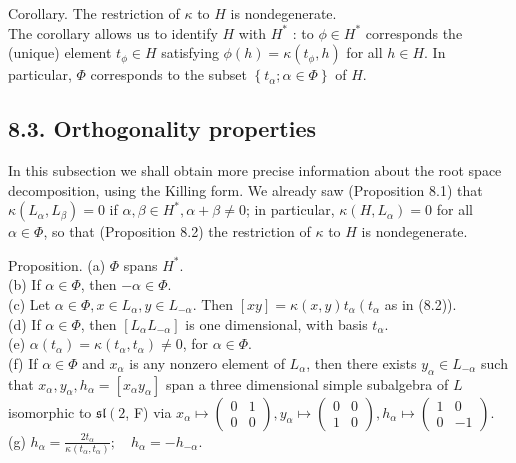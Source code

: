 \documentclass[10pt]{article}
\begin{document}
Corollary. The restriction of $\kappa$ to $H$ is nondegenerate.\\
The corollary allows us to identify $H$ with $H^{*}$ : to $\phi \in H^{*}$ corresponds the (unique) element $t_{\phi} \in H$ satisfying $\phi(h)=\kappa\left(t_{\phi}, h\right)$ for all $h \in H$. In particular, $\Phi$ corresponds to the subset $\left\{t_{\alpha} ; \alpha \in \Phi\right\}$ of $H$.

\subsection*{8.3. Orthogonality properties}
In this subsection we shall obtain more precise information about the root space decomposition, using the Killing form. We already saw (Proposition 8.1) that $\kappa\left(L_{\alpha}, L_{\beta}\right)=0$ if $\alpha, \beta \in H^{*}, \alpha+\beta \neq 0$; in particular, $\kappa\left(H, L_{\alpha}\right)=0$ for all $\alpha \in \Phi$, so that (Proposition 8.2) the restriction of $\kappa$ to $H$ is nondegenerate.

Proposition. (a) $\Phi$ spans $H^{*}$.\\
(b) If $\alpha \in \Phi$, then $-\alpha \in \Phi$.\\
(c) Let $\alpha \in \Phi, x \in L_{\alpha}, y \in L_{-\alpha}$. Then $[x y]=\kappa(x, y) t_{\alpha}\left(t_{\alpha}\right.$ as in (8.2)).\\
(d) If $\alpha \in \Phi$, then $\left[L_{\alpha} L_{-\alpha}\right]$ is one dimensional, with basis $t_{\alpha}$.\\
(e) $\alpha\left(t_{\alpha}\right)=\kappa\left(t_{\alpha}, t_{\alpha}\right) \neq 0$, for $\alpha \in \Phi$.\\
(f) If $\alpha \in \Phi$ and $x_{\alpha}$ is any nonzero element of $L_{\alpha}$, then there exists $y_{\alpha} \in L_{-\alpha}$ such that $x_{\alpha}, y_{\alpha}, h_{\alpha}=\left[x_{\alpha} y_{\alpha}\right]$ span a three dimensional simple subalgebra of $L$ isomorphic to $\mathfrak{s l}\left(2\right.$, F) via $x_{\alpha} \mapsto\left(\begin{array}{ll}0 & 1 \\ 0 & 0\end{array}\right), y_{\alpha} \mapsto\left(\begin{array}{ll}0 & 0 \\ 1 & 0\end{array}\right), h_{\alpha} \mapsto\left(\begin{array}{rr}1 & 0 \\ 0 & -1\end{array}\right)$.\\
(g) $h_{\alpha}=\frac{2 t_{\alpha}}{\kappa\left(t_{\alpha}, t_{\alpha}\right)} ; \quad h_{\alpha}=-h_{-\alpha}$.
\end{document}
